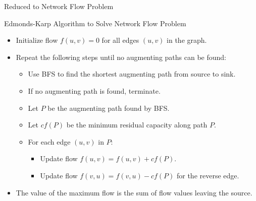 \documentclass{beamer}
\begin{document}
\begin{frame}{Reduced to Network Flow Problem}
        
    \end{frame}

\begin{frame}{Edmonds-Karp Algorithm to Solve Network Flow Problem}
        \begin{itemize}
        \item Initialize flow $f(u,v) = 0$ for all edges $(u,v)$ in the graph.
        \item Repeat the following steps until no augmenting paths can be found:
        \begin{itemize}
            \item Use BFS to find the shortest augmenting path from source to sink.
            \item If no augmenting path is found, terminate.
            \item Let $P$ be the augmenting path found by BFS.
            \item Let $cf(P)$ be the minimum residual capacity along path $P$.
            \item For each edge $(u,v)$ in $P$:
            \begin{itemize}
                \item Update flow $f(u,v) = f(u,v) + cf(P)$.
                \item Update flow $f(v,u) = f(v,u) - cf(P)$ for the reverse edge.
            \end{itemize}
        \end{itemize}
        \item The value of the maximum flow is the sum of flow values leaving the source.
    \end{itemize}

\end{frame}
\end{document}
